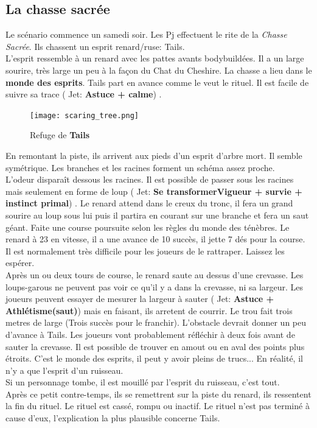 \documentclass[oneside,12pt]{book}
\newcommand\roll[1]{
( Jet: \textbf{#1})
}
\begin{document}
\begin{flushleft}
\section{La chasse sacrée}
Le scénario commence un samedi soir.
Les Pj effectuent le rite de la \textit{Chasse Sacrée}. Ils chassent un esprit renard/ruse: Tails. \\
L'esprit ressemble à un renard avec les pattes avants bodybuildées. Il a un large sourire, très large un peu à la façon du Chat du Cheshire. La chasse a lieu dans le \textbf{monde des esprits}. Tails part en avance comme le veut le rituel. Il est facile de suivre sa trace \roll{Astuce + calme}.\\
\begin{figure}[!h]
\caption{\label{arbre_mort} Refuge de \textbf{Tails}}
\texttt{[image: scaring\_tree.png]}
\end{figure}
En remontant la piste, ils arrivent aux pieds d'un esprit d'arbre mort. Il semble symétrique. Les branches et les racines forment un schéma assez proche.\\ 
L'odeur disparaît dessous les racines. Il est possible de passer sous les racines mais seulement en forme de loup \roll{Se transformerVigueur + survie + instinct primal}. 
Le renard attend dans le creux du tronc, il fera un grand sourire au loup sous lui puis il partira en courant sur une branche et fera un saut géant. 
Faite une course poursuite selon les règles du monde des ténèbres. Le renard à 23 en vitesse, il a une avance de 10 succès, il jette 7 dés pour la course. Il est normalement très difficile pour les joueurs de le rattraper. 
Laissez les espérer.\\ 
Après un ou deux tours de course, le renard saute au dessus d'une crevasse. 
Les loups-garous ne peuvent pas voir ce qu'il y a dans la crevasse, ni sa largeur. Les joueurs peuvent essayer de mesurer la largeur à sauter \roll{Astuce + Athlétisme(saut)} mais en faisant, ils arretent de courrir. 
Le trou fait trois metres de large (Trois succès pour le franchir). 
L'obstacle devrait donner un peu d'avance à Tails. 
Les joueurs vont probablement réfléchir à deux fois avant de sauter la crevasse. Il est possible de trouver en amout ou en aval des points plus étroits.
C'est le monde des esprits, il peut y avoir pleins de trucs... En réalité, il n'y a que l'esprit d'un ruisseau. \\ 

Si un personnage tombe, il est mouillé par l'esprit du ruisseau, c'est tout.\\
Après ce petit contre-temps, ils se remettrent sur la piste du renard, ils ressentent la fin du rituel. Le rituel est cassé, rompu ou inactif. Le rituel n'est pas terminé à cause d'eux, l'explication la plus plausible concerne Tails.


\end{flushleft}
\end{document}
